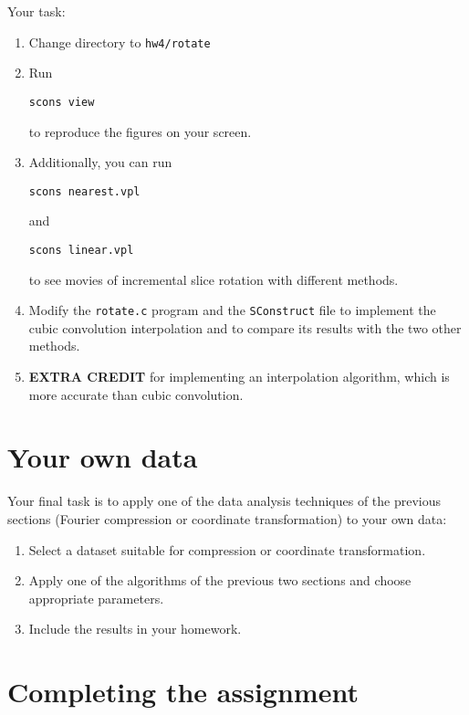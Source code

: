 Your task:
\begin{enumerate}
\item Change directory to \texttt{hw4/rotate}
\item Run 
\begin{verbatim}
scons view
\end{verbatim}
to reproduce the figures on your screen.
\item Additionally, you can run
\begin{verbatim}
scons nearest.vpl
\end{verbatim}
and
\begin{verbatim}
scons linear.vpl
\end{verbatim}
to see movies of incremental slice rotation with different methods.
\item Modify the \texttt{rotate.c} program and the \texttt{SConstruct} file to implement 
the cubic convolution interpolation and to compare 
its results with the two other methods.
\item \textbf{EXTRA CREDIT} for implementing an interpolation algorithm, which 
is more accurate than cubic convolution.
\end{enumerate}

\section{Your own data}

Your final task is to apply one of the data analysis techniques of the
previous sections (Fourier compression or coordinate transformation) to your own data:
\begin{enumerate}
\item Select a dataset suitable for compression or coordinate transformation. 
\item Apply one of the algorithms of the previous two sections and choose appropriate parameters.
\item Include the results in your homework.
\end{enumerate}


\section{Completing the assignment}

